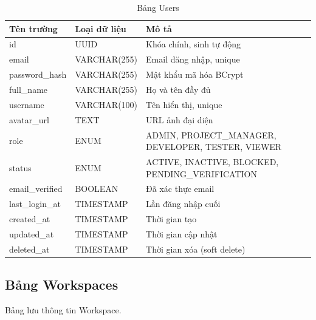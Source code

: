 \documentclass[12pt,a4paper]{report}
\begin{document}
\begin{table}[H]
\centering
\caption{Bảng Users}
\begin{tabular}{|p{4cm}|p{4cm}|p{7cm}|}
\hline
\textbf{Tên trường} & \textbf{Loại dữ liệu} & \textbf{Mô tả} \\
\hline
id & UUID & Khóa chính, sinh tự động \\
\hline
email & VARCHAR(255) & Email đăng nhập, unique \\
\hline
password\_hash & VARCHAR(255) & Mật khẩu mã hóa BCrypt \\
\hline
full\_name & VARCHAR(255) & Họ và tên đầy đủ \\
\hline
username & VARCHAR(100) & Tên hiển thị, unique \\
\hline
avatar\_url & TEXT & URL ảnh đại diện \\
\hline
role & ENUM & ADMIN, PROJECT\_MANAGER, DEVELOPER, TESTER, VIEWER \\
\hline
status & ENUM & ACTIVE, INACTIVE, BLOCKED, PENDING\_VERIFICATION \\
\hline
email\_verified & BOOLEAN & Đã xác thực email \\
\hline
last\_login\_at & TIMESTAMP & Lần đăng nhập cuối \\
\hline
created\_at & TIMESTAMP & Thời gian tạo \\
\hline
updated\_at & TIMESTAMP & Thời gian cập nhật \\
\hline
deleted\_at & TIMESTAMP & Thời gian xóa (soft delete) \\
\hline
\end{tabular}
\label{tab:users_table}
\end{table}


\subsection{Bảng Workspaces}

Bảng lưu thông tin Workspace.
\end{document}
